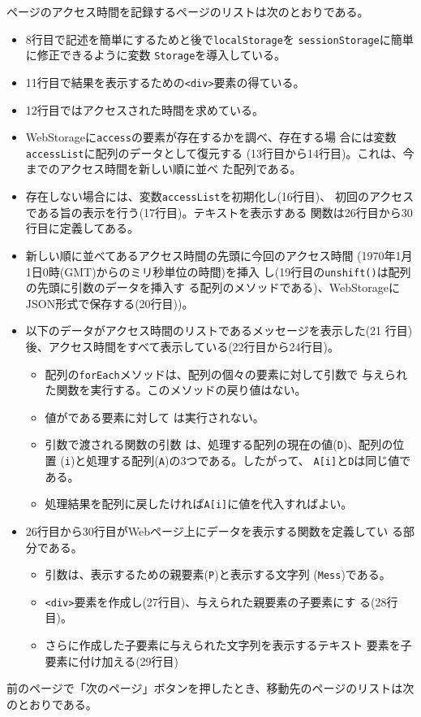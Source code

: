 \begin{Exec}
ページのアクセス時間を記録するページのリストは次のとおりである。
 \begin{itemize}
	\item 8行目で記述を簡単にするためと後で\texttt{localStorage}を
				\texttt{sessionStorage}に簡単に修正できるように変数
				\texttt{Storage}を導入している。
	\item 11行目で結果を表示するための\texttt{<div>}要素の得ている。
	\item 12行目ではアクセスされた時間を求めている。
	\item WebStorageに\texttt{access}の要素が存在するかを調べ、存在する場
				合には変数\texttt{accessList}に配列のデータとして復元する
				(13行目から14行目)。これは、今までのアクセス時間を新しい順に並べ
				た配列である。
	\item 存在しない場合には、変数\texttt{accessList}を初期化し(16行目)、
				初回のアクセスである旨の表示を行う(17行目)。テキストを表示すある
				関数は26行目から30行目に定義してある。
	\item 新しい順に並べてあるアクセス時間の先頭に今回のアクセス時間
				(1970年1月1日0時(GMT)からのミリ秒単位の時間)を挿入
				し(19行目の\texttt{unshift()}は配列の先頭に引数のデータを挿入す
				る配列のメソッドである)、WebStorageにJSON形式で保存する(20行目))。
	\item 以下のデータがアクセス時間のリストであるメッセージを表示した(21
				行目)後、アクセス時間をすべて表示している(22行目から24行目)。
\begin{itemize}
 \item 配列の\texttt{forEach}メソッドは、配列の個々の要素に対して引数で
			 与えられた関数を実行する。このメソッドの戻り値はない。
 \item 値がである要素に対して
			 は実行されない。
 \item 引数で渡される関数の引数
				は、処理する配列の現在の値(\texttt{D})、配列の位置
			 (\texttt{i})と処理する配列(\texttt{A})の3つである。したがって、
			 \texttt{A[i]}と\texttt{D}は同じ値である。
 \item 処理結果を配列に戻したければ\texttt{A[i]}に値を代入すればよい。
\end{itemize}
	\item 26行目から30行目がWebページ上にデータを表示する関数を定義してい
				る部分である。
				\begin{itemize}
				 \item 引数は、表示するための親要素(\texttt{P})と表示する文字列
							 (\texttt{Mess})である。
				 \item \texttt{<div>}要素を作成し(27行目)、与えられた親要素の子要素にす
							 る(28行目)。
				 \item さらに作成した子要素に与えられた文字列を表示するテキスト
							 要素を子要素に付け加える(29行目)
				\end{itemize}
				
 \end{itemize}
前のページで「次のページ」ボタンを押したとき、移動先のページのリストは次
 のとおりである。
\end{Exec}
